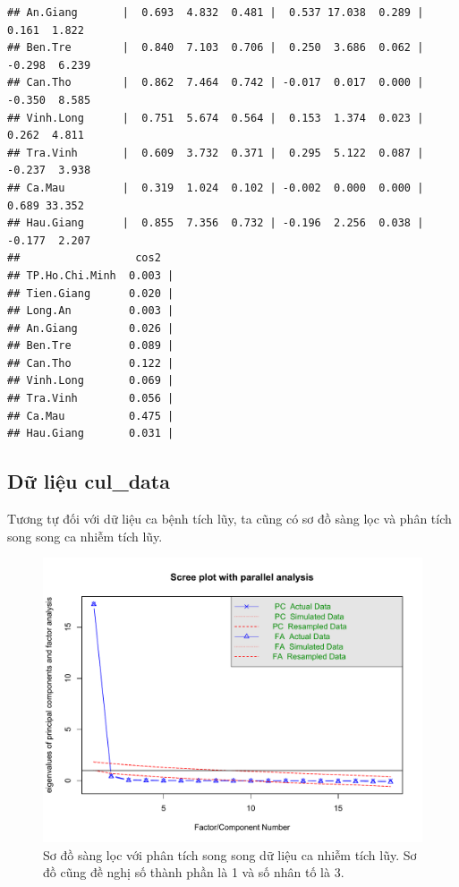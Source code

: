 \documentclass[../thesis.tex]{subfiles}
\begin{document}
\begin{verbatim}
## An.Giang       |  0.693  4.832  0.481 |  0.537 17.038  0.289 |  0.161  1.822
## Ben.Tre        |  0.840  7.103  0.706 |  0.250  3.686  0.062 | -0.298  6.239
## Can.Tho        |  0.862  7.464  0.742 | -0.017  0.017  0.000 | -0.350  8.585
## Vinh.Long      |  0.751  5.674  0.564 |  0.153  1.374  0.023 |  0.262  4.811
## Tra.Vinh       |  0.609  3.732  0.371 |  0.295  5.122  0.087 | -0.237  3.938
## Ca.Mau         |  0.319  1.024  0.102 | -0.002  0.000  0.000 |  0.689 33.352
## Hau.Giang      |  0.855  7.356  0.732 | -0.196  2.256  0.038 | -0.177  2.207
##                  cos2  
## TP.Ho.Chi.Minh  0.003 |
## Tien.Giang      0.020 |
## Long.An         0.003 |
## An.Giang        0.026 |
## Ben.Tre         0.089 |
## Can.Tho         0.122 |
## Vinh.Long       0.069 |
## Tra.Vinh        0.056 |
## Ca.Mau          0.475 |
## Hau.Giang       0.031 |
\end{verbatim}


\newpage
\subsection{Dữ liệu \textbf{\textsf{cul\_data}}}

Tương tự đối với dữ liệu ca bệnh tích lũy, ta cũng có sơ đồ sàng lọc và phân tích song song ca nhiễm tích lũy.
\begin{Shaded}
	\begin{Highlighting}[]
\SpecialCharTok{\%\textgreater{}\%}\SpecialCharTok{::}
		 \NormalTok{)}
	\end{Highlighting}
\end{Shaded}



\begin{figure}[H]
	\centering
	\includegraphics[width=1\linewidth]{images/scree_parallcul}
	\caption[Sơ đồ sàng lọc với phân tích song song dữ liệu ca nhiễm hằng ngày]{Sơ đồ sàng lọc với phân tích song song dữ liệu ca nhiễm tích lũy. Sơ đồ cũng đề nghị số thành phần là 1 và số nhân tố là 3. }
	\label{fig:screeparallcul}
\end{figure}
\end{document}
